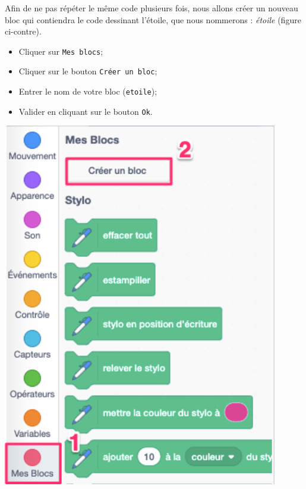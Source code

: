 \begin{minipage}[c]{0.55\linewidth}
Afin de ne pas répéter le même code plusieurs fois, nous allons créer un nouveau bloc qui contiendra le code dessinant l’étoile, que nous nommerons : \emph{étoile} (figure ci-contre).

\vspace{6pt}

  \begin{itemize}
    \item {} Cliquer sur \texttt{Mes blocs};
    \item {} Cliquer sur le bouton \texttt{Créer un bloc};
    \item {} Entrer le nom de votre bloc (\texttt{etoile});
    \item {} Valider en cliquant sur le bouton \texttt{Ok}.
  \end{itemize}
\end{minipage} \hfill%
\begin{minipage}[c]{0.38\linewidth}
  \includegraphics[width=0.9\textwidth]{./images/scratch03/fonction/creerBloc1.png}
\end{minipage}


